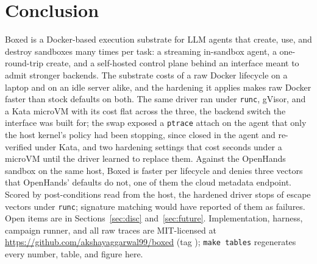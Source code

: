 \documentclass[conference]{IEEEtran}
\begin{document}
\section{Conclusion}\label{sec:conc}

Boxed is a Docker-based execution substrate for LLM agents that create, use,
and destroy sandboxes many times per task: a streaming in-sandbox agent, a
one-round-trip create, and a self-hosted control plane behind an interface
meant to admit stronger backends. The substrate costs \BoxedOverheadPct{}
of a raw Docker lifecycle on a laptop and on an idle server alike, and the
hardening it applies makes raw Docker faster than stock defaults on both.
The same driver ran under \texttt{runc}, gVisor, and a Kata microVM with
its cost flat across the three, the backend switch the interface was built
for; the swap exposed a \texttt{ptrace} attach on the agent that
only the host kernel's policy had been stopping, since closed in the agent
and re-verified under Kata, and two hardening settings that cost seconds
under a microVM until the driver learned to replace them. Against the
OpenHands sandbox on the same host, Boxed is \OHVsBoxed{} faster per
lifecycle and denies three vectors that OpenHands' defaults do not, one of
them the cloud metadata endpoint. Scored by post-conditions read from the host, the hardened driver stops
\BoxedEscapeDenied{} of \BoxedEscapeTotal{} escape vectors under
\texttt{runc}; signature matching would have reported
\BoxedEscapeSigDisagree{} of them as failures. Open items are in
Sections~\ref{sec:disc} and~\ref{sec:future}. Implementation, harness, campaign runner, and all
raw traces are MIT-licensed at
\url{https://github.com/akshayaggarwal99/boxed} (tag
\texttt{\BoxedReleaseTag}); \texttt{make tables} regenerates every
number, table, and figure here.




\end{document}
